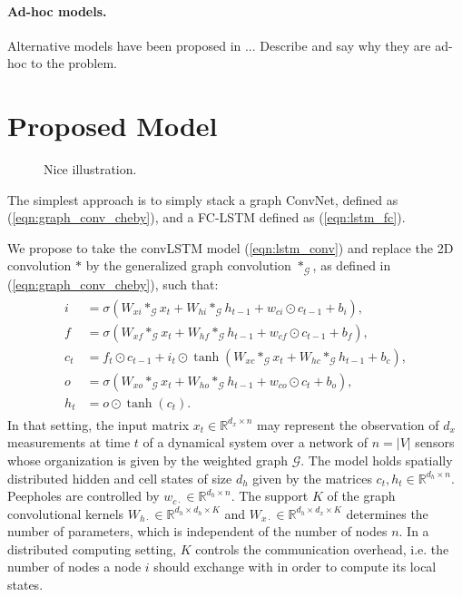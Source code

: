\documentclass{article} %
\newcommand{\R}{\mathbb{R}}
\newcommand{\G}{\mathcal{G}}
\newcommand{\eqnref}[1]{(\ref{eqn:#1})}
\newcommand{\todo}[1]{{\color{red} #1 }}
\begin{document}
\paragraph{Ad-hoc models.} Alternative models have been proposed \todo{in ...
Describe and say why they are ad-hoc to the problem.}

\section{Proposed Model}


\begin{figure}[ht]
	\centering
	\fbox{\rule[-.5cm]{0cm}{5cm} \rule[-.5cm]{\linewidth}{0cm}}
	\caption{\todo{Nice illustration.}}
\end{figure}

The simplest approach is to simply stack a graph ConvNet, defined as
\eqnref{graph_conv_cheby}, and a FC-LSTM defined as \eqnref{lstm_fc}.

We propose to take the convLSTM model \eqnref{lstm_conv} and replace the 2D
convolution $\ast$ by the generalized graph convolution $\ast_\G$, as defined
in \eqnref{graph_conv_cheby}, such that:
\begin{align} \label{eqn:lstm_graph}
\begin{split}
	i &= \sigma(W_{xi} \ast_\G x_t + W_{hi} \ast_\G h_{t-1} + w_{ci} \odot c_{t-1} + b_i), \\
	f &= \sigma(W_{xf} \ast_\G x_t + W_{hf} \ast_\G h_{t-1} + w_{cf} \odot c_{t-1} + b_f), \\
	c_t &= f_t \odot c_{t-1} + i_t \odot \tanh(W_{xc} \ast_\G x_t + W_{hc} \ast_\G h_{t-1} + b_c), \\
	o &= \sigma(W_{xo} \ast_\G x_t + W_{ho} \ast_\G h_{t-1} + w_{co} \odot c_t + b_o), \\
	h_t &= o \odot \tanh(c_t).
\end{split}
\end{align}
In that setting, the input matrix $x_t \in \R^{d_x \times n}$ may represent the
observation of $d_x$ measurements at time $t$ of a dynamical system over a
network of $n = |V|$ sensors whose organization is given by the weighted graph
$\G$. The model holds spatially distributed hidden and cell states of size
$d_h$ given by the matrices $c_t, h_t \in \R^{d_h \times n}$. Peepholes are
controlled by $w_{c\cdot} \in \R^{d_h \times n}$. The support $K$ of the graph
convolutional kernels $W_{h\cdot} \in \R^{d_h \times d_h \times K}$ and
$W_{x\cdot} \in \R^{d_h \times d_x \times K}$ determines the number of
parameters, which is independent of the number of nodes $n$. In a distributed
computing setting, $K$ controls the communication overhead, i.e. the number of
nodes a node $i$ should exchange with in order to compute its local states.
\end{document}

